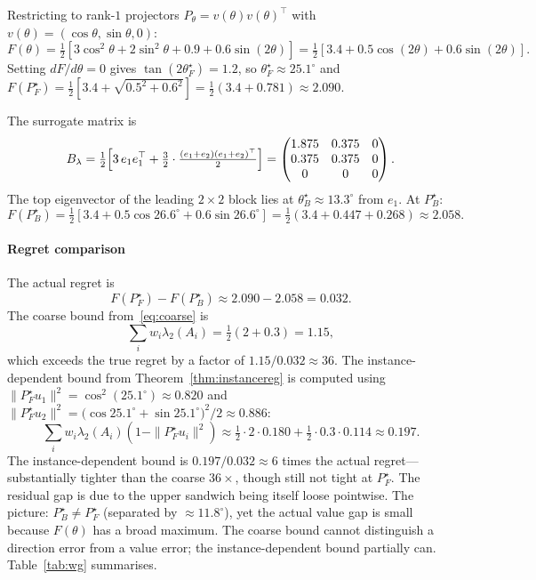 \documentclass[final,3p,times]{elsarticle}
\begin{document}
Restricting to rank-$1$ projectors $P_\theta=v(\theta)v(\theta)^\top$
with $v(\theta)=(\cos\theta,\sin\theta,0)$:
\begin{equation}
F(\theta)=\tfrac{1}{2}[3\cos^2\theta+2\sin^2\theta+0.9+0.6\sin(2\theta)]
=\tfrac{1}{2}[3.4+0.5\cos(2\theta)+0.6\sin(2\theta)].
\end{equation}
Setting $dF/d\theta=0$ gives $\tan(2\theta_F^\star)=1.2$, so
$\theta_F^\star\approx 25.1^\circ$ and
$F(P_F^\star)=\tfrac{1}{2}[3.4+\sqrt{0.5^2+0.6^2}]
=\tfrac{1}{2}(3.4+0.781)\approx 2.090$.

The surrogate matrix is
\begin{equation}
B_\lambda=\tfrac{1}{2}\Bigl[3\,e_1e_1^\top
+\tfrac{3}{2}\cdot\tfrac{(e_1+e_2)(e_1+e_2)^\top}{2}\Bigr]
=\begin{pmatrix} 1.875 & 0.375 & 0\\ 0.375 & 0.375 & 0\\ 0 & 0 & 0\end{pmatrix}.
\end{equation}
The top eigenvector of the leading $2\times 2$ block lies at
$\theta_B^\star\approx 13.3^\circ$ from $e_1$.
At $P_B^\star$:
\begin{equation}
F(P_B^\star)=\tfrac{1}{2}[3.4+0.5\cos 26.6^\circ+0.6\sin 26.6^\circ]
=\tfrac{1}{2}(3.4+0.447+0.268)\approx 2.058.
\end{equation}

\paragraph{Regret comparison}
The actual regret is
\begin{equation}
F(P_F^\star)-F(P_B^\star)\approx 2.090-2.058 = 0.032.
\end{equation}
The coarse bound from~\eqref{eq:coarse} is
\begin{equation}
\sum_i w_i\lambda_2(A_i)=\tfrac{1}{2}(2+0.3)=1.15,
\end{equation}
which exceeds the true regret by a factor of $1.15/0.032\approx 36$.
The instance-dependent bound from Theorem~\ref{thm:instancereg} is
computed using
$\|P_F^\star u_1\|^2=\cos^2(25.1^\circ)\approx 0.820$ and
$\|P_F^\star u_2\|^2=\bigl(\cos 25.1^\circ+\sin 25.1^\circ\bigr)^2/2
\approx 0.886$:
\begin{equation}
\sum_i w_i\lambda_2(A_i)(1-\|P_F^\star u_i\|^2)
\approx \tfrac{1}{2}\cdot 2\cdot 0.180+\tfrac{1}{2}\cdot 0.3\cdot 0.114
\approx 0.197.
\end{equation}
The instance-dependent bound is $0.197/0.032\approx 6$ times the actual
regret---substantially tighter than the coarse $36\times$, though
still not tight at $P_F^\star$.
The residual gap is due to the upper sandwich being itself loose
pointwise.
The picture: $P_B^\star\ne P_F^\star$ (separated by $\approx 11.8^\circ$),
yet the actual value gap is small because $F(\theta)$ has a broad
maximum.
The coarse bound cannot distinguish a direction error from a value
error; the instance-dependent bound partially can.
Table~\ref{tab:wg} summarises.
\end{document}
